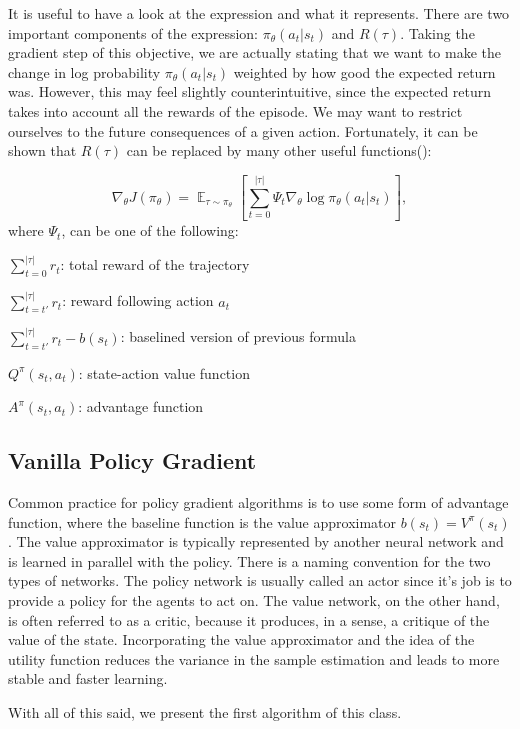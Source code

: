 It is useful to have a look at the expression and what it represents. 
There are two important components of the expression: $\pi_\theta(a_t|s_t)$ and $R(\tau)$.
Taking the gradient step of this objective, we are actually stating that we want to make the change in log probability $\pi_\theta(a_t|s_t)$ weighted by how good the expected return was.
However, this may feel slightly counterintuitive, since the expected return takes into account all the rewards of the episode.
We may want to restrict ourselves to the future consequences of a given action.
Fortunately, it can be shown that $R(\tau)$ can be replaced by many other useful functions(\cite{GAE}):

\[
  \nabla_\theta J(\pi_\theta) = \mathop{\mathbb{E}}_{\tau \sim \pi_\theta}\left[\sum_{t=0}^{|\tau|} \Psi_t \nabla_\theta \log \pi_\theta(a_t|s_t)\right],
\]
where $\Psi_t$, can be one of the following:
\begin{list}{}{}
  \item $\sum_{t=0}^{|\tau|} r_t$: total reward of the trajectory
  \item $\sum_{t=t'}^{|\tau|} r_t$: reward following action $a_t$
  \item $\sum_{t=t'}^{|\tau|} r_t - b(s_t)$: baselined version of previous formula
  \item $Q^\pi(s_t,a_t)$: state-action value function
  \item $A^\pi(s_t,a_t)$: advantage function
\end{list}

\subsection{Vanilla Policy Gradient}
Common practice for policy gradient algorithms is to use some form of advantage function, where the baseline function is the value approximator $b(s_t) = V^\pi(s_t)$.
The value approximator is typically represented by another neural network and is learned in parallel with the policy.
There is a naming convention for the two types of networks.
The policy network is usually called an actor since it's job is to provide a policy for the agents to act on.
The value network, on the other hand, is often referred to as a critic, because it produces, in a sense, a critique of the value of the state.
Incorporating the value approximator and the idea of the utility function reduces the variance in the sample estimation and leads to more stable and faster learning.

With all of this said, we present the first algorithm of this class.

